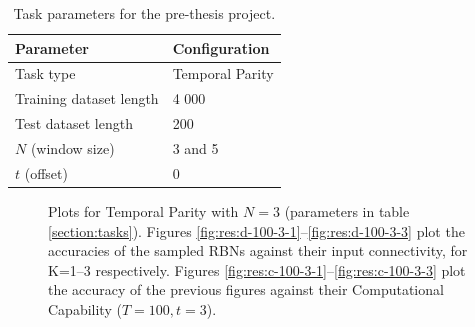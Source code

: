 \begin{table}[ht]
    \centering
    \caption{Task parameters for the pre-thesis project.}
    \label{table:pre-thesis-tasks}
    \begin{tabular}{ll}
        \hline
        \textbf{Parameter} & \textbf{Configuration} \\
        \hline
        \hline
        Task type               & Temporal Parity \\
        Training dataset length & 4 000                       \\
        Test dataset length     & 200                         \\
        $N$ (window size)       & 3 and 5                     \\
        $t$ (offset)            & 0 \\
        \hline
    \end{tabular}
\end{table}

\begin{figure}[!t]
    \centering
    \caption{
        Plots for Temporal Parity with $N=3$ (parameters in table \ref{section:tasks}).
        Figures \ref{fig:res:d-100-3-1}--\ref{fig:res:d-100-3-3} plot the accuracies of the sampled RBNs against their input connectivity,
        for K=1–3 respectively.
        Figures \ref{fig:res:c-100-3-1}--\ref{fig:res:c-100-3-3} plot the accuracy of the previous figures against their Computational Capability ($T=100, t=3$).
    }
    \label{figure:results:temporal-parity-3}


\end{figure}

